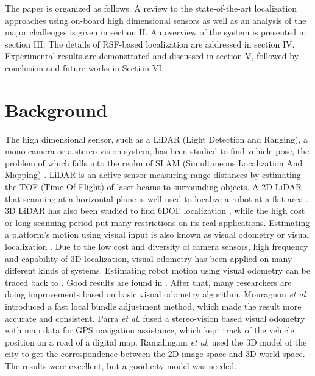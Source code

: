 \documentclass[letterpaper, 10 pt, conference]{ieeeconf}  %
\begin{document}
The paper is organized as follows. A review to the state-of-the-art localization approaches using on-board high dimensional sensors as well as an analysis of the major challenges is given in section II. An overview of the system is presented in section III. The details of RSF-based localization are addressed in section IV. Experimental results are demonstrated and discussed in section V, followed by conclusion and future works in Section VI.

\section{Background}

The high dimensional sensor, such as a LiDAR (Light Detection and Ranging), a mono camera or a stereo vision system, has been studied to find vehicle pose, the problem of which falls into the realm of SLAM (Simultaneous Localization And Mapping) \cite{durrant2006simultaneous}. LiDAR is an active sensor measuring range distances by estimating the TOF (Time-Of-Flight) of laser beams to surrounding objects. A 2D LiDAR that scanning at a horizontal plane is well used to localize a robot at a flat area \cite{zhang2000line}. 3D LiDAR has also been studied to find 6DOF localization \cite{moosmann2011velodyne}, while the high cost or long scanning period put many restrictions on its real applications. Estimating a platform's motion using visual input is also known as visual odometry or visual localization \cite{nister2004visual}. Due to the low cost and diversity of camera sensors, high frequency and capability of 3D localization, visual odometry has been applied on many different kinds of systems.
Estimating robot motion using visual odometry can be traced back to \cite{moravec1980obstacle}. Good results are found in \cite{nister2004visual}. After that, many researchers are doing improvements based on basic visual odometry algorithm. Mouragnon \emph{et al}.\cite{mouragnon2006real} introduced a fast local bundle adjustment method, which made the result more accurate and consistent. Parra \emph{et al}.\cite{parra2011visual} fused a stereo-vision based visual odometry with map data for GPS navigation assistance, which kept track of the vehicle position on a road of a digital map. Ramalingam \emph{et al}.\cite{ramalingam2011pose, ramalingam2010skyline2gps} used the 3D model of the city to get the correspondence between the 2D image space and 3D world space. The results were excellent, but a good city model was needed.

\end{document}
